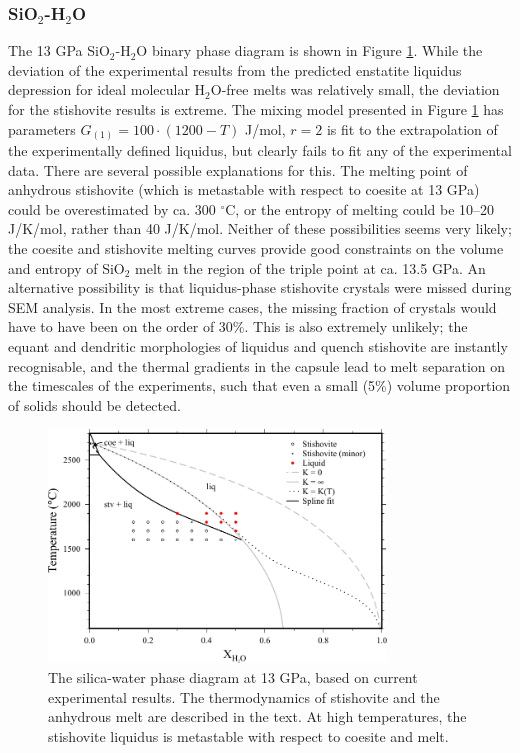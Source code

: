 \documentclass[review]{elsarticle}
\begin{document}
\subsubsection{SiO$_2$-H$_2$O}
The 13 GPa SiO$_2$-H$_2$O binary phase diagram is shown in Figure \ref{fig:SH}. While the deviation of the experimental results from the predicted enstatite liquidus depression for ideal molecular H$_2$O-free melts was relatively small, the deviation for the stishovite results is extreme. The mixing model presented in Figure \ref{fig:SH} has parameters $G_{(1)} = 100 \cdot (1200-T)$ J/mol, $r=2$ is fit to the extrapolation of the experimentally defined liquidus, but clearly fails to fit any of the experimental data. There are several possible explanations for this. The melting point of anhydrous stishovite (which is metastable with respect to coesite at 13 GPa) could be overestimated by ca. 300 $^{\circ}$C, or the entropy of melting could be 10--20 J/K/mol, rather than 40 J/K/mol. Neither of these possibilities seems very likely; the coesite and stishovite melting curves \citep{ZLGHF1993} provide good constraints on the volume and entropy of SiO$_2$ melt in the region of the triple point at ca. 13.5 GPa. An alternative possibility is that liquidus-phase stishovite crystals were missed during SEM analysis. In the most extreme cases, the missing fraction of crystals would have to have been on the order of 30\%. This is also extremely unlikely; the equant and dendritic morphologies of liquidus and quench stishovite are instantly recognisable, and the thermal gradients in the capsule lead to melt separation on the timescales of the experiments, such that even a small (5\%) volume proportion of solids should be detected.

\begin{figure}[ht!]
  \centering
      \includegraphics[width=0.8\textwidth]{figures/stishovite_edited}
      \caption{The silica-water phase diagram at 13 GPa, based on current experimental results. The thermodynamics of stishovite and the anhydrous melt are described in the text. At high temperatures, the stishovite liquidus is metastable with respect to coesite and melt.}
  \label{fig:SH}
\end{figure}
\end{document}

